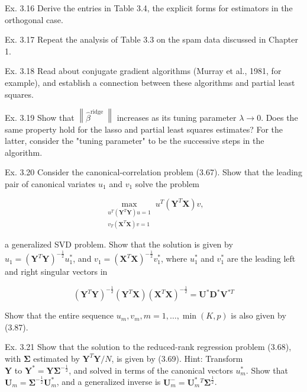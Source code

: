 \documentclass[10pt]{article}
\begin{document}
Ex. 3.16 Derive the entries in Table 3.4, the explicit forms for estimators in the orthogonal case.

Ex. 3.17 Repeat the analysis of Table 3.3 on the spam data discussed in Chapter 1.

Ex. 3.18 Read about conjugate gradient algorithms (Murray et al., 1981, for example), and establish a connection between these algorithms and partial least squares.

Ex. 3.19 Show that $\left\|\hat{\beta}^{\text {ridge }}\right\|$ increases as its tuning parameter $\lambda \rightarrow 0$. Does the same property hold for the lasso and partial least squares estimates? For the latter, consider the "tuning parameter" to be the successive steps in the algorithm.

Ex. 3.20 Consider the canonical-correlation problem (3.67). Show that the leading pair of canonical variates $u_{1}$ and $v_{1}$ solve the problem


\begin{equation*}
\max _{\substack{u^{T}\left(\mathbf{Y}^{T} \mathbf{Y}\right) u=1 \\ v_{T}\left(\mathbf{X}^{T} \mathbf{X}\right) v=1}} u^{T}\left(\mathbf{Y}^{T} \mathbf{X}\right) v, \tag{3.86}
\end{equation*}


a generalized SVD problem. Show that the solution is given by $u_{1}= \left(\mathbf{Y}^{T} \mathbf{Y}\right)^{-\frac{1}{2}} u_{1}^{*}$, and $v_{1}=\left(\mathbf{X}^{T} \mathbf{X}\right)^{-\frac{1}{2}} v_{1}^{*}$, where $u_{1}^{*}$ and $v_{1}^{*}$ are the leading left and right singular vectors in


\begin{equation*}
\left(\mathbf{Y}^{T} \mathbf{Y}\right)^{-\frac{1}{2}}\left(\mathbf{Y}^{T} \mathbf{X}\right)\left(\mathbf{X}^{T} \mathbf{X}\right)^{-\frac{1}{2}}=\mathbf{U}^{*} \mathbf{D}^{*} \mathbf{V}^{* T} \tag{3.87}
\end{equation*}


Show that the entire sequence $u_{m}, v_{m}, m=1, \ldots, \min (K, p)$ is also given by (3.87).

Ex. 3.21 Show that the solution to the reduced-rank regression problem (3.68), with $\boldsymbol{\Sigma}$ estimated by $\mathbf{Y}^{T} \mathbf{Y} / N$, is given by (3.69). Hint: Transform\\
$\mathbf{Y}$ to $\mathbf{Y}^{*}=\mathbf{Y} \boldsymbol{\Sigma}^{-\frac{1}{2}}$, and solved in terms of the canonical vectors $u_{m}^{*}$. Show that $\mathbf{U}_{m}=\boldsymbol{\Sigma}^{-\frac{1}{2}} \mathbf{U}_{m}^{*}$, and a generalized inverse is $\mathbf{U}_{m}^{-}=\mathbf{U}_{m}^{*}{ }^{T} \boldsymbol{\Sigma}^{\frac{1}{2}}$.
\end{document}
